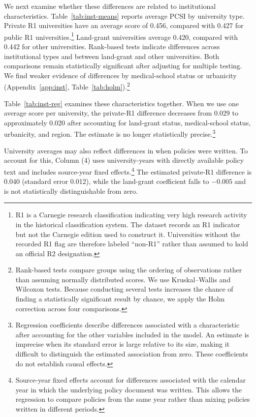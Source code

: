 \documentclass[11pt]{article}
\begin{document}
We next examine whether these differences are related to institutional characteristics. Table~\ref{tab:inst-means} reports average PCSI by university type. Private R1 universities have an average score of 0.456, compared with 0.427 for public R1 universities.\footnote{R1 is a Carnegie research classification indicating very high research activity in the historical classification system. The dataset records an R1 indicator but not the Carnegie edition used to construct it. Universities without the recorded R1 flag are therefore labeled ``non-R1'' rather than assumed to hold an official R2 designation.} Land-grant universities average 0.420, compared with 0.442 for other universities. Rank-based tests indicate differences across institutional types and between land-grant and other universities. Both comparisons remain statistically significant after adjusting for multiple testing. We find weaker evidence of differences by medical-school status or urbanicity (Appendix~\ref{app:inst}, Table~\ref{tab:holm}).\footnote{Rank-based tests compare groups using the ordering of observations rather than assuming normally distributed scores. We use Kruskal--Wallis and Wilcoxon tests. Because conducting several tests increases the chance of finding a statistically significant result by chance, we apply the Holm correction across four comparisons.}



Table~\ref{tab:inst-reg} examines these characteristics together. When we use one average score per university, the private-R1 difference decreases from 0.029 to approximately 0.020 after accounting for land-grant status, medical-school status, urbanicity, and region. The estimate is no longer statistically precise.\footnote{Regression coefficients describe differences associated with a characteristic after accounting for the other variables included in the model. An estimate is imprecise when its standard error is large relative to its size, making it difficult to distinguish the estimated association from zero. These coefficients do not establish causal effects.}

University averages may also reflect differences in when policies were written. To account for this, Column (4) uses university-years with directly available policy text and includes source-year fixed effects.\footnote{Source-year fixed effects account for differences associated with the calendar year in which the underlying policy document was written. This allows the regression to compare policies from the same year rather than mixing policies written in different periods.} The estimated private-R1 difference is 0.040 (standard error 0.012), while the land-grant coefficient falls to $-0.005$ and is not statistically distinguishable from zero.
\end{document}
